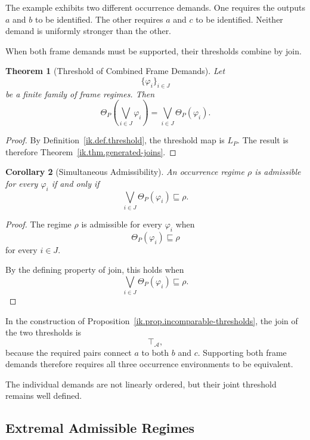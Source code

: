 \documentclass[11pt]{article}
\theoremstyle{plain}
\newtheorem{theorem}{Theorem}[section]
\newtheorem{corollary}[theorem]{Corollary}
\theoremstyle{definition}
\theoremstyle{remark}
\begin{document}
The example exhibits two different occurrence demands.
One requires the outputs \(a\) and \(b\) to be identified.
The other requires \(a\) and \(c\) to be identified.
Neither demand is uniformly stronger than the other.

When both frame demands must be supported,
their thresholds combine by join.

\begin{theorem}[Threshold of Combined Frame Demands]
  \label{ik.thm.combined-threshold}
  Let
  \[
    \{
    \varphi_i
    \}_{i\in J}
  \]
  be a finite family of frame regimes.
  Then
  \[
    \Theta_P
    \left(
    \bigvee_{i\in J}
    \varphi_i
    \right)
    =
    \bigvee_{i\in J}
    \Theta_P(\varphi_i).
  \]
\end{theorem}

\begin{proof}
  By Definition~\ref{ik.def.threshold},
  the threshold map is \(L_P\).
  The result is therefore
  Theorem~\ref{ik.thm.generated-joins}.
\end{proof}

\begin{corollary}[Simultaneous Admissibility]
  \label{ik.cor.simultaneous-admissibility}
  An occurrence regime \(\rho\)
  is admissible for every
  \(\varphi_i\)
  if and only if
  \[
    \bigvee_{i\in J}
    \Theta_P(\varphi_i)
    \sqsubseteq
    \rho.
  \]
\end{corollary}

\begin{proof}
  The regime \(\rho\)
  is admissible for every \(\varphi_i\)
  when
  \[
    \Theta_P(\varphi_i)
    \sqsubseteq
    \rho
  \]
  for every \(i\in J\).

  By the defining property of join,
  this holds when
  \[
    \bigvee_{i\in J}
    \Theta_P(\varphi_i)
    \sqsubseteq
    \rho.
  \]
\end{proof}

In the construction of
Proposition~\ref{ik.prop.incomparable-thresholds},
the join of the two thresholds is
\[
  \top_{\mathcal{A}},
\]
because the required pairs
connect \(a\) to both \(b\) and \(c\).
Supporting both frame demands
therefore requires all three occurrence environments
to be equivalent.

The individual demands are not linearly ordered,
but their joint threshold remains well defined.

\subsection{Extremal Admissible Regimes}
\end{document}
